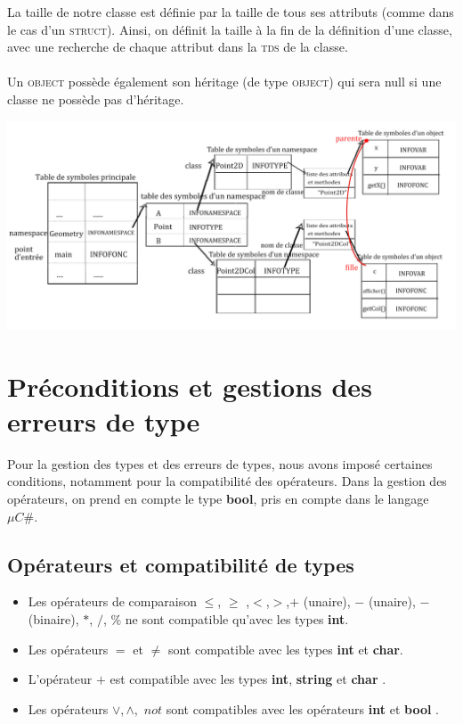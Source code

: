 \documentclass[11pt,a4paper]{report}
\begin{document}
La taille de notre classe est définie par la taille de tous ses attributs (comme dans le cas d'un \textsc{struct}). Ainsi, on définit la taille à la fin de la définition d'une classe, avec une recherche de chaque attribut dans la \textsc{tds} de la classe. \\\\
Un \textsc{object} possède également son héritage (de type \textsc{object}) qui sera null si une classe ne possède pas d'héritage.


\includegraphics[scale=0.25]{microCsharp.jpg}



\section{Préconditions et gestions des erreurs de type}

Pour la gestion des types et des erreurs de types, nous avons imposé certaines conditions, notamment pour la compatibilité des opérateurs. Dans la gestion des opérateurs, on prend en compte le type {\bf bool}, pris en compte dans le langage $\mu C \#$.


\subsection{Opérateurs et compatibilité de types}

\begin{itemize}
\item Les opérateurs de comparaison $\leq$, $\geq$ ,$<$,$>$,$+$ (unaire), $-$ (unaire), $-$ (binaire), $*$, $/$, $\%$ ne sont compatible qu'avec les types \textbf{ int}.
\item Les opérateurs $=$ et $\neq$  sont compatible avec les types {\bf int} et {\bf char}.
\item L'opérateur $+$ est compatible avec les types {\bf int}, {\bf string } et {\bf char }.
\item Les opérateurs $\vee,\wedge,$ $not$ sont compatibles avec les opérateurs {\bf int } et {\bf bool }.
\end{itemize}
\end{document}
